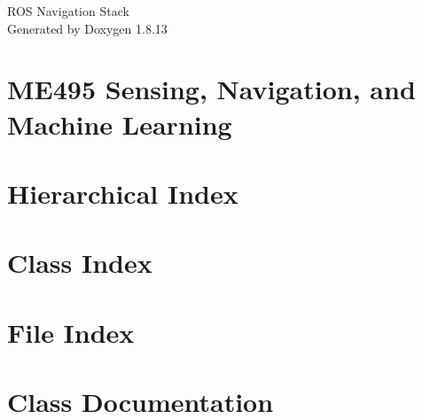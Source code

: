 \documentclass[twoside]{book}
\newcommand{\+}{\discretionary{\mbox{\scriptsize$\hookleftarrow$}}{}{}}
\newcommand{\clearemptydoublepage}{%
  \newpage{\pagestyle{empty}\cleardoublepage}%
}
\begin{document}
\hypersetup{pageanchor=false,
             bookmarksnumbered=true,
             pdfencoding=unicode
            }
\begin{titlepage}
\vspace*{7cm}
\begin{center}%
{\Large R\+OS Navigation Stack }\\
\vspace*{1cm}
{\large Generated by Doxygen 1.8.13}\\
\end{center}
\end{titlepage}
\clearemptydoublepage
{}
\tableofcontents
\clearemptydoublepage
{}
\hypersetup{pageanchor=true}

\chapter{M\+E495 Sensing, Navigation, and Machine Learning}
\label{index}\hypertarget{index}{}
\chapter{Hierarchical Index}

\chapter{Class Index}

\chapter{File Index}

\chapter{Class Documentation}

















\end{document}
